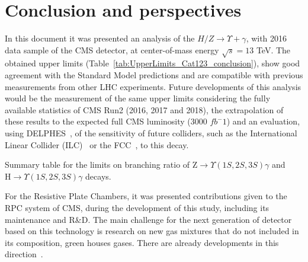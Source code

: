 \chapter{Conclusion and perspectives}
\label{chapter_conclusion_and_perspectives}

In this document it was presented an analysis of the $H/Z \rightarrow \Upsilon + \gamma$, with 2016 data sample of the CMS detector, at center-of-mass energy $\sqrt{s}=13$ TeV. The obtained upper limits (Table~\ref{tab:UpperLimits_Cat123_conclusion}), show good agreement with the Standard Model predictions and are compatible with previous measurements from other LHC experiments. Future developments of this analysis would be the measurement of the same upper limits considering the fully available statistics of CMS Run2 (2016, 2017 and 2018), the extrapolation of these results to the expected full CMS luminosity (3000 $fb^-1$) and an evaluation, using DELPHES~\cite{delphes},  of the sensitivity of future colliders, such as the International Linear Collider (ILC)~\cite{ilc} or the FCC~\cite{fcc}, to this decay.

\begin{table}[ht]
    \begin{center}
    \caption{Summary table for the limits on branching ratio of $\mathrm{Z}\to\Upsilon(1S,2S,3S)\gamma$ and $\mathrm{H}\to\Upsilon(1S,2S,3S)\gamma$ decays.}
    
    \label{tab:UpperLimits_Cat123_conclusion}
    \end{center}
\end{table}

For the Resistive Plate Chambers, it was presented contributions given to the RPC system of CMS, during the development of this study, including its maintenance and R\&D. The main challenge for the next generation of detector based on this technology is research on new gas mixtures that do not included in its composition, green houses gases. There are already developments in this direction~\cite{eco_gas}. 